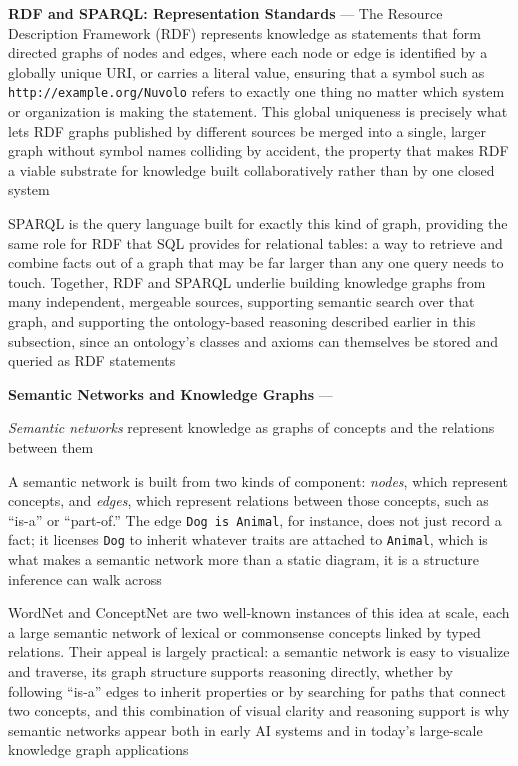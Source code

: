 \textbf{RDF and SPARQL: Representation Standards} --- The Resource
Description Framework (RDF) represents knowledge as statements that form
directed graphs of nodes and edges, where each node or edge is identified
by a globally unique URI, or carries a literal value, ensuring that a
symbol such as \texttt{http://example.org/Nuvolo} refers to exactly one
thing no matter which system or organization is making the statement. This
global uniqueness is precisely what lets RDF graphs published by different
sources be merged into a single, larger graph without symbol names
colliding by accident, the property that makes RDF a viable substrate for
knowledge built collaboratively rather than by one closed system

SPARQL is the query language built for exactly this kind of graph,
providing the same role for RDF that SQL provides for relational tables:
a way to retrieve and combine facts out of a graph that may be far larger
than any one query needs to touch. Together, RDF and SPARQL underlie
building knowledge graphs from many independent, mergeable sources,
supporting semantic search over that graph, and supporting the
ontology-based reasoning described earlier in this subsection, since an
ontology's classes and axioms can themselves be stored and queried as RDF
statements

\textbf{Semantic Networks and Knowledge Graphs} --- \begin{definition}
  \emph{Semantic networks} represent knowledge as graphs of concepts and
  the relations between them
\end{definition}
A semantic network is built from two kinds of component: \emph{nodes},
which represent concepts, and \emph{edges}, which represent relations
between those concepts, such as ``is-a'' or ``part-of.'' The edge
\texttt{Dog is Animal}, for instance, does not just record a fact; it
licenses \texttt{Dog} to inherit whatever traits are attached to
\texttt{Animal}, which is what makes a semantic network more than a static
diagram, it is a structure inference can walk across

WordNet and ConceptNet are two well-known instances of this idea at scale,
each a large semantic network of lexical or commonsense concepts linked by
typed relations. Their appeal is largely practical: a semantic network is
easy to visualize and traverse, its graph structure supports reasoning
directly, whether by following ``is-a'' edges to inherit properties or by
searching for paths that connect two concepts, and this combination of
visual clarity and reasoning support is why semantic networks appear both
in early AI systems and in today's large-scale knowledge graph
applications

